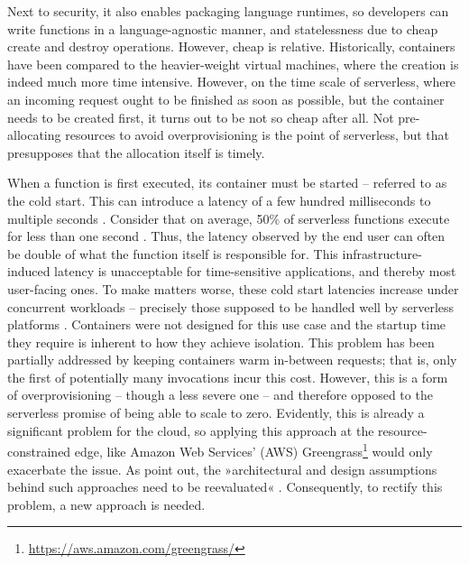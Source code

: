 Next to security, it also enables packaging language runtimes, so developers can write functions in a language-agnostic manner, and statelessness due to cheap create and destroy operations. However, cheap is relative. Historically, containers have been compared to the heavier-weight virtual machines, where the creation is indeed much more time intensive. However, on the time scale of serverless, where an incoming request ought to be finished as soon as possible, but the container needs to be created first, it turns out to be not so cheap after all. Not pre-allocating resources to avoid overprovisioning is the point of serverless, but that presupposes that the allocation itself is timely.

When a function is first executed, its container must be started -- referred to as the cold start. This can introduce a latency of a few hundred milliseconds to multiple seconds \cite{Manner2018, Wang2018}. Consider that on average, 50\% of serverless functions execute for less than one second \cite{Shahrad2020}. Thus, the latency observed by the end user can often be double of what the function itself is responsible for. This infrastructure-induced latency is unacceptable for time-sensitive applications, and thereby most user-facing ones.
To make matters worse, these cold start latencies increase under concurrent workloads -- precisely those supposed to be handled well by serverless platforms \cite{Mohan2019}. Containers were not designed for this use case and the startup time they require is inherent to how they achieve isolation.
This problem has been partially addressed by keeping containers warm in-between requests; that is, only the first of potentially many invocations incur this cost. However, this is a form of overprovisioning -- though a less severe one -- and therefore opposed to the serverless promise of being able to scale to zero.
Evidently, this is already a significant problem for the cloud, so applying this approach at the resource-constrained edge, like Amazon Web Services' (AWS) Greengrass\footnote{\url{https://aws.amazon.com/greengrass/}} would only exacerbate the issue.
As \citeauthor{Nastic2018} point out, the »architectural and design assumptions behind such approaches need to be reevaluated« \cite{Nastic2018}. Consequently, to rectify this problem, a new approach is needed.


